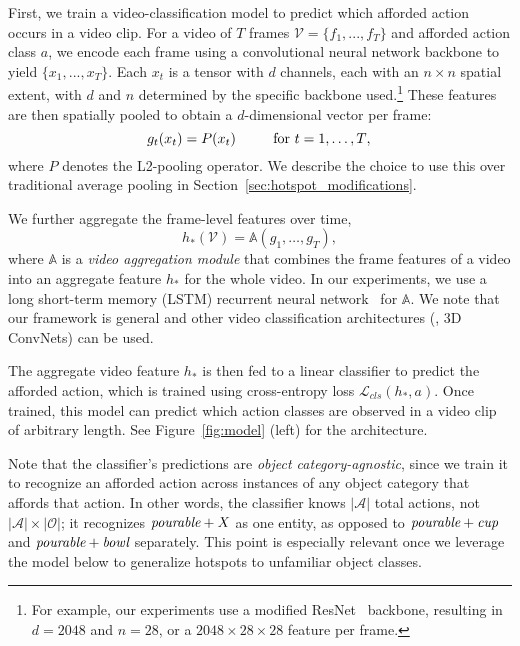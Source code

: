\documentclass[10pt,twocolumn,letterpaper]{article}
\newcommand{\reffig}[1]{Figure~\ref{#1}}
\newcommand{\refsec}[1]{Section~\ref{#1}}
\begin{document}
First, we train a video-classification model to predict which afforded action occurs in a video clip. For a video of $T$ frames $\mathcal{V}=\{f_1, ..., f_T\}$ and afforded action class $a$, we encode each frame using a convolutional neural network backbone to yield $\{x_1, ..., x_T\}$. Each $x_t$ is a tensor with $d$ channels, each with an $n \times n$ spatial extent, 
with $d$ and $n$ determined by the specific backbone used.\footnote{For example, our experiments use a modified ResNet~\cite{he2016deep} backbone, resulting in $d=2048$ and $n=28$, or a $2048\times 28\times 28$ feature per frame.}  These features are then spatially pooled to obtain a $d$-dimensional vector per frame:
\begin{equation}
g_t(x_t) = P(x_t) ~~~~~~~~\textrm{for $t=1,\dots,T$}, \\
\label{eq:action_clf}
\end{equation}
where $P$ denotes the L2-pooling operator.  We describe the choice to use this over traditional average pooling in \refsec{sec:hotspot_modifications}.


We further aggregate the frame-level features over time,
\begin{equation}
h_*(\mathcal{V}) = \mathbb{A}(g_1,\dots,g_T),
\end{equation}
where $\mathbb{A}$ is a \emph{video aggregation module} that combines the frame features of a video into an aggregate feature $h_*$ for the whole video. 
In our experiments, we use a long short-term memory (LSTM) recurrent neural network~\cite{hochreiter1997long} for $\mathbb{A}$. We note that our framework is general and other video classification architectures (\eg, 3D ConvNets) can be used.



The aggregate video feature $h_*$ is then fed to a linear classifier to predict the afforded action, which is trained using cross-entropy loss $\mathcal{L}_{cls}(h_*, a)$.
Once trained, this model can predict which action classes are observed in a video clip of arbitrary length. 
See \reffig{fig:model} (left) for the architecture. 


Note that the classifier's predictions are \emph{object category-agnostic}, since we train it to recognize an afforded action across instances of any object category that affords that action.  In other words, the classifier knows $|\mathcal{A}|$ total actions, not $|\mathcal{A}| \times |\mathcal{O}|$; it recognizes $\emph{pourable}+X$ as one entity, as opposed to $\emph{pourable}+\emph{cup}$ and $\emph{pourable}+\emph{bowl}$ separately. This point is especially relevant once we leverage the model below to generalize hotspots to unfamiliar object classes.
\end{document}
